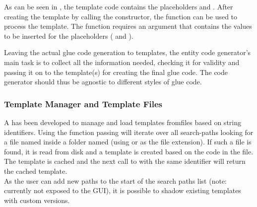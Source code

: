 As can be seen in , the template code contains the placeholders  and . After creating the  template by calling the  constructor, the  function can be used to process the template. The function requires an argument that contains the values to be inserted for the placeholders ( and ).

Leaving the actual glue code generation to templates, the entity code generator's main task is to collect all the information needed, checking it for validity and passing it on to the template(s) for creating the final glue code. The code generator should thus be agnostic to different styles of glue code.

\subsubsection{Template Manager and Template Files}

A  has been developed to manage and load templates from\linebreak files based on string identifiers. Using the  function passing \linebreak{} will iterate over all search-paths looking for a file named  inside a folder named  (using  or  as the file extension). If such a file is found, it is read from disk and a template is created based on the code in the file. The template is cached and the next call to  with the same identifier will return the cached template.\\
As the user can add new paths to the start of the search paths list (note: currently not exposed to the GUI), it is possible to shadow existing templates with custom versions.

